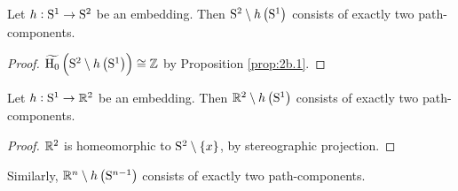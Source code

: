 \begin{corollary}
Let $ h : \S^1 \to \S^2 $ be an embedding. Then $ \S^2 \setminus h\br{\S^1} $ consists of exactly two path-components.
\end{corollary}

\begin{proof}
$ \widetilde{\H_0}\br{\S^2 \setminus h\br{\S^1}} \cong \ZZ $ by Proposition \ref{prop:2b.1}.
\end{proof}

\begin{corollary}
Let $ h : \S^1 \to \RR^2 $ be an embedding. Then $ \RR^2 \setminus h\br{\S^1} $ consists of exactly two path-components.
\end{corollary}

\begin{proof}
$ \RR^2 $ is homeomorphic to $ \S^2 \setminus \cbr{x} $, by stereographic projection.
\end{proof}

Similarly, $ \RR^n \setminus h\br{\S^{n - 1}} $ consists of exactly two path-components.

\pagebreak


